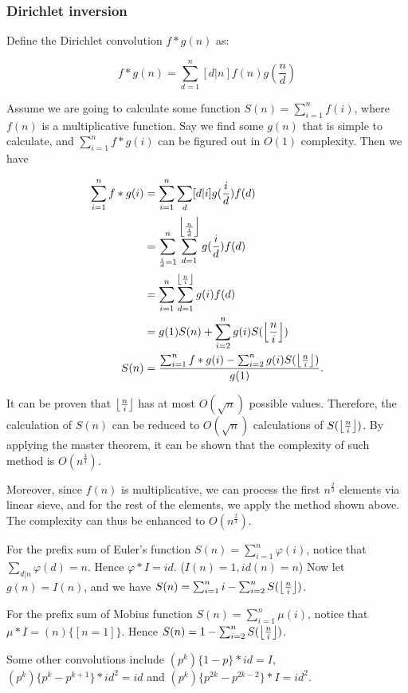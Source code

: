 \subsubsection{Dirichlet inversion}
Define the Dirichlet convolution $f*g(n)$ as:

$$f*g(n)=\sum^n_{d=1}[d|n]f(n)g(\frac{n}{d})$$

Assume we are going to calculate some function $S(n)=\sum^n_{i=1}f(i)$,
where $f(n)$ is a multiplicative function.
Say we find some $g(n)$ that is simple to calculate,
and $\sum^n_{i=1}f*g(i)$ can be figured out in $O(1)$ complexity.
Then we have

\begin{equation*}
\begin{split}
\sum^n_{i=1}f*g(i)	&=\sum^n_{i=1}\sum_d[d|i]g(\frac{i}{d})f(d)\\
					&=\sum^n_{\frac{i}{d}=1}\sum^{\floor*{\frac{n}{\frac{i}{d}}}}_{d=1}g(\frac{i}{d})f(d)\\
					&=\sum^n_{i=1}\sum^{\floor*{\frac{n}{i}}}_{d=1}g(i)f(d)\\
					&=g(1)S(n)+\sum^n_{i=2}g(i)S(\floor*{\frac{n}{i}})\\
S(n)				&=\frac{\sum^n_{i=1}f*g(i)-\sum^n_{i=2}g(i)S(\floor*{\frac{n}{i}})}{g(1)}.\\
\end{split}
\end{equation*}

It can be proven that $\floor*{\frac{n}{i}}$ has at most $O(\sqrt{n})$ possible values.
Therefore, the calculation of $S(n)$ can be reduced to $O(\sqrt{n})$ calculations of $S(\floor*{\frac{n}{i}})$.
By applying the master theorem, it can be shown that the complexity of such method is $O(n^{\frac{3}{4}})$.

Moreover, since $f(n)$ is multiplicative, we can process the first $n^{\frac{2}{3}}$ elements via linear sieve,
and for the rest of the elements, we apply the method shown above. The complexity can thus be enhanced to $O(n^{\frac{2}{3}})$.

For the prefix sum of Euler's function $S(n)=\sum^n_{i=1}\varphi(i)$, notice that $\sum_{d|n}\varphi(d)=n$.
Hence $\varphi*I=id$. ($I(n)=1,id(n)=n$)
Now let $g(n)=I(n)$, and we have $S(n)=\sum^n_{i=1}i-\sum^n_{i=2}S(\floor*{\frac{n}{i}})$.

For the prefix sum of Mobius function $S(n)=\sum^n_{i=1}\mu(i)$, notice that $\mu*I=(n)\{[n=1]\}$.
Hence $S(n)=1-\sum^n_{i=2}S(\floor*{\frac{n}{i}})$.

Some other convolutions include $(p^k)\{1-p\}*id=I$, $(p^k)\{p^k-p^{k+1}\}*id^2=id$ and $(p^k)\{p^{2k}-p^{2k-2}\}*I=id^2$.

